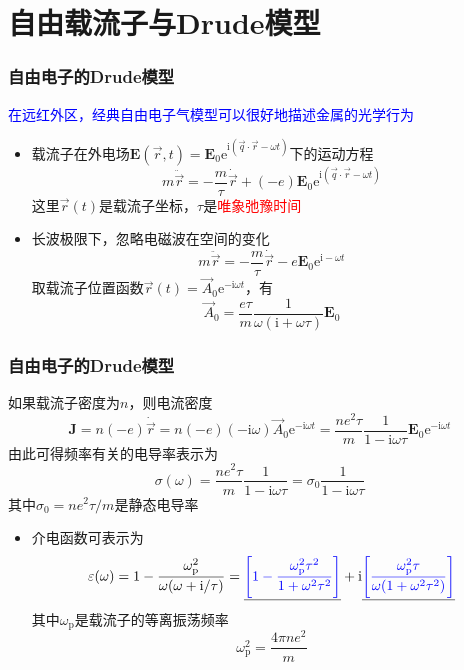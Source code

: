\documentclass[cjk,slidestop,compress,mathserif,blue]{beamer}
\begin{document}
\section{自由载流子与\rm{Drude}模型}
\frame
{
	\frametitle{自由电子的\textrm{Drude}模型}
	\textcolor{blue}{在远红外区，经典自由电子气模型可以很好地描述金属的光学行为}
	\begin{itemize}
		\item 载流子在外电场$\mathbf{E}(\vec r,t)=\mathbf{E}_0\mathrm{e}^{\mathrm{i}(\vec q\cdot\vec r-\omega t)}$下的运动方程
			\begin{displaymath}
				m\ddot{\vec r}=-\frac m{\tau}\dot{\vec r}+(-e)\mathbf{E}_0\mathrm{e}^{\mathrm{i}(\vec q\cdot\vec r-\omega t)}
			\end{displaymath}
			这里$\vec r(t)$是载流子坐标，$\tau$是\textcolor{red}{唯象弛豫时间}
		\item 长波极限下，忽略电磁波在空间的变化
			\begin{displaymath}
				m\ddot{\vec r}=-\frac m{\tau}\dot{\vec r}-e\mathbf{E}_0\mathrm{e}^{\mathrm{i}-\omega t}
			\end{displaymath}
			取载流子位置函数$\vec r(t)=\vec A_0\mathrm{e}^{-\mathrm{i}\omega t}$，有
			\begin{displaymath}
				\vec A_0=\frac{e\tau}m\frac1{\omega(\mathrm{i}+\omega\tau)}\mathbf{E}_0
			\end{displaymath}
	\end{itemize}
}

\frame
{
	\frametitle{自由电子的\textrm{Drude}模型}
	如果载流子密度为$n$，则电流密度
	\begin{displaymath}
		\mathbf{J}=n(-e)\dot{\vec r}=n(-e)(-\mathrm{i}\omega)\vec A_0\mathrm{e}^{-\mathrm{i}\omega t}=\frac{ne^2\tau}m\frac1{1-\mathrm{i}\omega\tau}\mathbf{E}_0\mathrm{e}^{-\mathrm{i}\omega t}
	\end{displaymath}
	由此可得频率有关的电导率表示为
	\begin{displaymath}
		\sigma(\omega)=\frac{ne^2\tau}m\frac1{1-\mathrm{i}\omega\tau}=\sigma_0\frac1{1-\mathrm{i}\omega\tau}
	\end{displaymath}
	其中$\sigma_0=ne^2\tau/m$是静态电导率
	\begin{itemize}
		\item 介电函数可表示为
			\begin{displaymath}
				\varepsilon(\omega)=1-\frac{\omega_\mathrm{p}^2}{\omega(\omega+\mathrm{i}/\tau)}=\underline{\textcolor{blue}{\left[ 1-\frac{\omega_{\mathrm{p}}^2\tau^2}{1+\omega^2\tau^2} \right]}}+\mathrm{i}\underline{\textcolor{blue}{\left[ \frac{\omega_{\mathrm{p}}^2\tau}{\omega(1+\omega^2\tau^2)} \right]}}
			\end{displaymath}
			其中$\omega_{\mathrm{p}}$是载流子的等离振荡频率
			\begin{displaymath}
				\omega_{\mathrm{p}}^2=\frac{4\pi ne^2}m
			\end{displaymath}
	\end{itemize}
}
\end{document}

